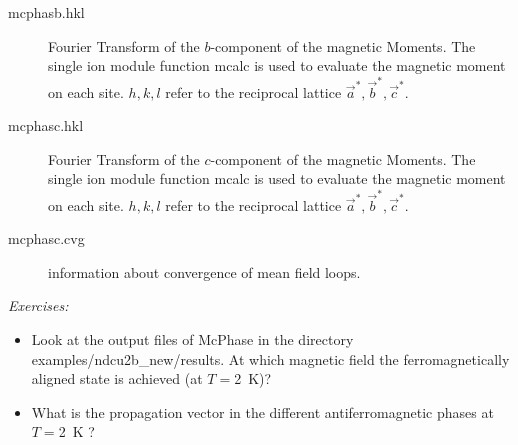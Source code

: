 \begin{description}
 \item [\prg mcphasb.hkl]    Fourier Transform of the $b$-component of the magnetic Moments. The single ion module function
    {\prg mcalc} is used to evaluate the magnetic moment on each site. 
                           $h,k,l$ refer to the reciprocal lattice $\vec a^*,\vec b^*,\vec c^*$.
 \item [\prg mcphasc.hkl]    Fourier Transform of the $c$-component of the magnetic Moments. The single ion module function
    {\prg mcalc} is used to evaluate the magnetic moment on each site.
                           $h,k,l$ refer to the reciprocal lattice $\vec a^*,\vec b^*,\vec c^*$.
 \item [\prg mcphasc.cvg]   information about convergence of mean field loops.
                            \end{description} 




\vspace{1cm}
{\em Exercises:}
\begin{itemize}
\item Look at the output files of {\prg McPhase}  in the directory
{\prg examples/ndcu2b\_new/results}.  At which magnetic field
the ferromagnetically aligned state is achieved (at $T=$2~K)?
\item
What is the propagation vector in the different antiferromagnetic phases at $T=$2~K ?
\end{itemize}

